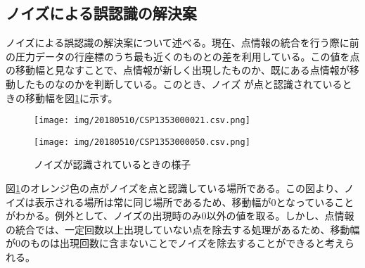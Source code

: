 \subsection{ノイズによる誤認識の解決案}
ノイズによる誤認識の解決案について述べる。現在、点情報の統合を行う際に前の圧力データの行座標のうち最も近くのものとの差を利用している。この値を点の移動幅と見なすことで、点情報が新しく出現したものか、既にある点情報が移動したものなのかを判断している。このとき、ノイズ が点と認識されているときの移動幅を図\ref{f:solution_noise}に示す。
\begin{figure}[H]
	\centering
	\begin{minipage}[b]{0.45\linewidth}
		\centering
		\texttt{[image: img/20180510/CSP1353000021.csv.png]}
	\end{minipage}
	\begin{minipage}[b]{0.45\linewidth}
		\centering
		\texttt{[image: img/20180510/CSP1353000050.csv.png]}
	\end{minipage}
	\caption{ノイズが認識されているときの様子}
	\label{f:solution_noise}
\end{figure}
図\ref{f:solution_noise}のオレンジ色の点がノイズを点と認識している場所である。この図より、ノイズは表示される場所は常に同じ場所であるため、移動幅が0となっていることがわかる。例外として、ノイズの出現時のみ0以外の値を取る。しかし、点情報の統合では、一定回数以上出現していない点を除去する処理があるため、移動幅が0のものは出現回数に含まないことでノイズを除去することができると考えられる。

